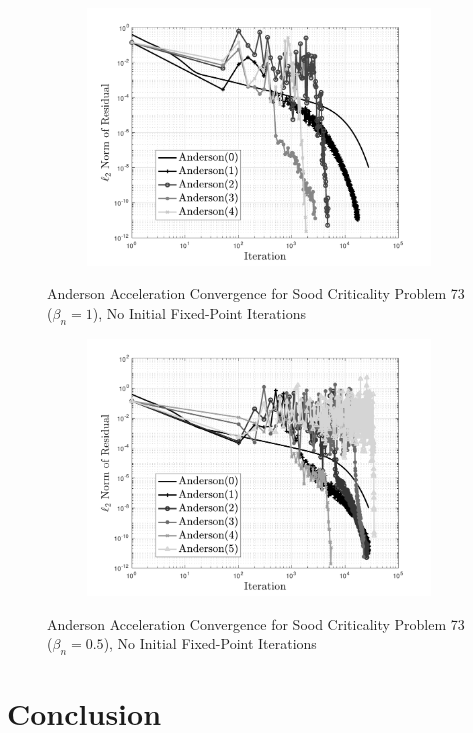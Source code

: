 \begin{figure}[!htbp]
\centering
\begin{subfigure}{\textwidth}
  \centering
  \includegraphics[width=.73\linewidth]{Figures/AndersonAcceleration/SoodProb73}
\end{subfigure}
\caption{Anderson Acceleration Convergence for Sood Criticality Problem 73 ($\beta_{n} = 1$), No Initial Fixed-Point Iterations}
\label{fig:AASoodProb73}
\end{figure}

\begin{figure}[!htbp]
\centering
\begin{subfigure}{\textwidth}
  \centering
  \includegraphics[width=.73\linewidth]{Figures/AndersonAcceleration/SoodProb73_FPI1_HalfBeta}
\end{subfigure}
\caption{Anderson Acceleration Convergence for Sood Criticality Problem 73 ($\beta_{n} = 0.5$), No Initial Fixed-Point Iterations}
\label{fig:AASoodProb73Half}
\end{figure}

\clearpage

\section{Conclusion}

